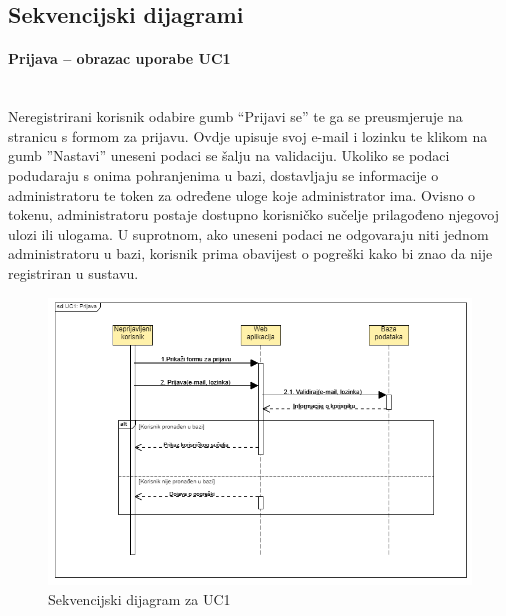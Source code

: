 			\subsection{Sekvencijski dijagrami}
			
				\paragraph{Prijava – obrazac uporabe UC1}\mbox{} \\
				\noindent Neregistrirani korisnik odabire gumb “Prijavi se” te ga se preusmjeruje na stranicu s formom za prijavu. Ovdje upisuje svoj e-mail i lozinku te klikom na gumb ”Nastavi” uneseni podaci se šalju na validaciju. Ukoliko se podaci podudaraju s onima pohranjenima  u bazi, dostavljaju se informacije o administratoru te token za određene uloge koje administrator ima. Ovisno o tokenu, administratoru postaje dostupno korisničko sučelje prilagođeno njegovoj ulozi ili ulogama. U suprotnom, ako uneseni podaci ne odgovaraju niti jednom administratoru u bazi, korisnik prima obavijest o pogreški kako bi znao da nije registriran u sustavu. 
				
				\begin{figure}[H]
					\includegraphics[width=\textwidth]{slike/sd1.PNG} %
					\caption{Sekvencijski dijagram za UC1}
					\label{fig:sd1} %
				\end{figure}
				
				\eject
				
